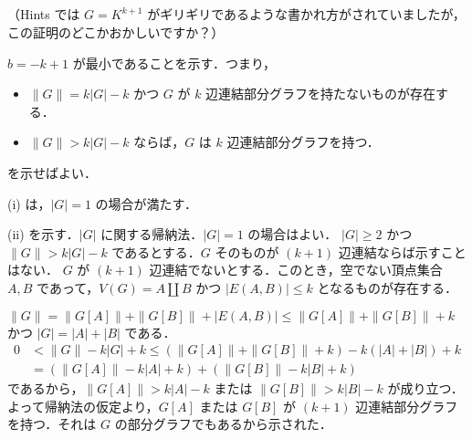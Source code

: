 \subsection{}
（Hints では $G = K^{k+1}$ がギリギリであるような書かれ方がされていましたが，この証明のどこかおかしいですか？）


$b = -k + 1$ が最小であることを示す．つまり，
\begin{itemize}
 \item $\|G\| = k|G| - k$ かつ $G$ が $k$ 辺連結部分グラフを持たないものが存在する．
 \item $\|G\| > k|G| - k$ ならば，$G$ は $k$ 辺連結部分グラフを持つ．
\end{itemize}
を示せばよい．

(i) は，$|G| = 1$ の場合が満たす．

(ii) を示す．$|G|$ に関する帰納法．$|G|=1$ の場合はよい．
$|G|\geq 2$ かつ $\|G\| > k|G| - k$ であるとする．$G$ そのものが $(k+1)$ 辺連結ならば示すことはない．
$G$ が $(k+1)$ 辺連結でないとする．このとき，空でない頂点集合 $A, B$ であって，$V(G) = A\amalg B$ かつ $|E(A,B)|\leq k$ となるものが存在する．

$\|G\| = \|G[A]\| + \|G[B]\| + |E(A,B)| \leq \|G[A]\| + \|G[B]\| + k$ かつ $|G| = |A| + |B|$ である．
\begin{align*}
 0 &< \|G\| - k|G| + k \leq (\|G[A]\| + \|G[B]\| + k) - k(|A|+|B|) + k\\
   & = (\|G[A]\| - k|A|+k) + (\|G[B]\| - k|B|+k) 
\end{align*}
であるから，$\|G[A]\| > k|A|-k$ または $\|G[B]\| > k|B|-k$ が成り立つ．よって帰納法の仮定より，$G[A]$ または $G[B]$ が
$(k+1)$ 辺連結部分グラフを持つ．それは $G$ の部分グラフでもあるから示された．
